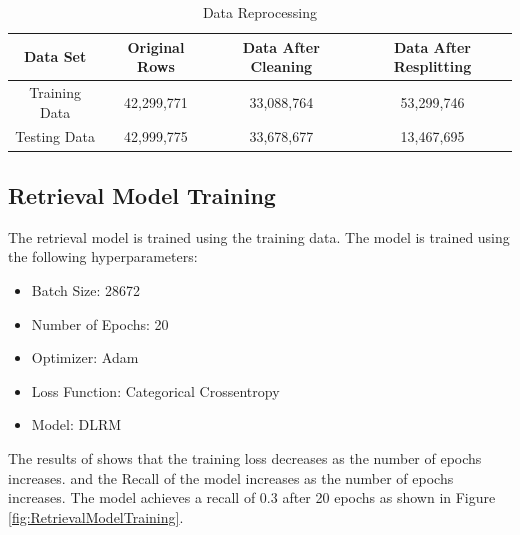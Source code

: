 \begin{table}[ht]
\centering
\begin{tabular}{|c|c|c|c|}
\hline
\textbf{Data Set} & \textbf{Original Rows} & \textbf{Data After Cleaning} & \textbf{Data After Resplitting} \\
\hline
Training Data & 42,299,771 & 33,088,764 & 53,299,746 \\
\hline
Testing Data & 42,999,775 & 33,678,677 & 13,467,695 \\
\hline
\end{tabular}
\caption{Data Reprocessing}
\label{tab:data-reprocessing}
\end{table}


\subsection{Retrieval Model Training}

The retrieval model is trained using the training data. The model is trained using the following hyperparameters:

\begin{itemize}
\item Batch Size: 28672
\item Number of Epochs: 20
\item Optimizer: Adam
\item Loss Function: Categorical Crossentropy
\item Model: DLRM
\end{itemize}


The results of shows that the training loss decreases as the number of epochs increases. and the Recall of the model increases as the number of epochs increases. The model achieves a recall of 0.3 after 20 epochs as shown in Figure \ref{fig:RetrievalModelTraining}.

